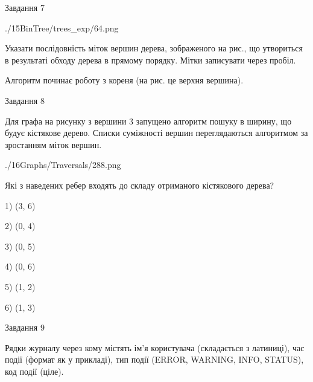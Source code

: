 \documentclass[12pt, ukrainian]{article}
\begin{document}
{\vspace{10mm}\par

\newpage
\begin{minipage}[t]{9.7cm}
               
{\begin{center}Завдання {7}\end{center}}
\vspace{-6mm}

\begin{center}
	{./15BinTree/trees_exp/64.png}
\end{center}
Указати послідовність міток вершин дерева, зображеного на рис., що утвориться в результаті обходу дерева в прямому порядку. Мітки записувати через пробіл.\par Алгоритм починає роботу з кореня (на рис. це верхня вершина).\par

\end{minipage}
\vline \hspace{8mm}
\begin{minipage}[t]{8.0cm}
               
{\begin{center}Завдання {8}\end{center}}
\vspace{-6mm}
Для графа на рисунку з вершини 3 запущено алгоритм пошуку в ширину, що будує кістякове дерево. Списки суміжності вершин переглядаються алгоритмом за зростанням міток вершин.\par
\begin{center}
	{./16Graphs/Traversals/288.png}
\end{center}
\par Які з наведених ребер входять до складу отриманого кістякового дерева?\par
1) (3, 6)\par
2) (0, 4)\par
3) (0, 5)\par
4) (0, 6)\par
5) (1, 2)\par
6) (1, 3)\par
{\vskip 15pt} \par

\end{minipage}

               
{\begin{center}Завдання {9}\end{center}}
\vspace{-6mm}
Рядки журналу через кому містять ім'я користувача (складається з латиниці), час події (фор\-мат як у прикладі), тип події (ERROR, WARNING, INFO, STATUS), код події (ціле).

}
\end{document}

